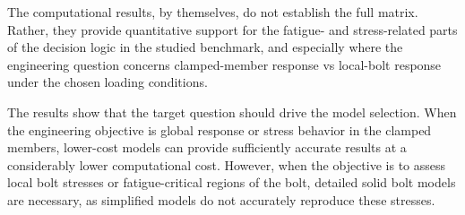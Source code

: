 \documentclass[a4paper,twoside]{bth}
\begin{document}
The computational results, by themselves, do not establish the full matrix. Rather, they provide quantitative support for the fatigue- and stress-related parts of the decision logic in the studied benchmark, and especially where the engineering question concerns clamped-member response vs local-bolt response under the chosen loading conditions.

The results show that the target question should drive the model selection. When the engineering objective is global response or stress behavior in the clamped members, lower-cost models can provide sufficiently accurate results at a considerably lower computational cost. However, when the objective is to assess local bolt stresses or fatigue-critical regions of the bolt, detailed solid bolt models are necessary, as simplified models do not accurately reproduce these stresses.
\end{document}

